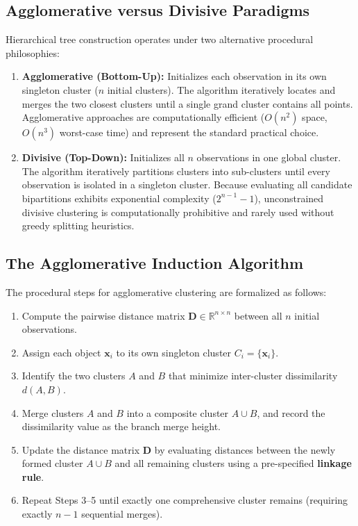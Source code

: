 \subsection{Agglomerative versus Divisive Paradigms}
Hierarchical tree construction operates under two alternative procedural philosophies:
\begin{enumerate}
    \item \textbf{Agglomerative (Bottom-Up):} Initializes each observation in its own singleton cluster ($n$ initial clusters). The algorithm iteratively locates and merges the two closest clusters until a single grand cluster contains all points. Agglomerative approaches are computationally efficient ($O(n^2)$ space, $O(n^3)$ worst-case time) and represent the standard practical choice.
    \item \textbf{Divisive (Top-Down):} Initializes all $n$ observations in one global cluster. The algorithm iteratively partitions clusters into sub-clusters until every observation is isolated in a singleton cluster. Because evaluating all candidate bipartitions exhibits exponential complexity ($2^{n-1} - 1$), unconstrained divisive clustering is computationally prohibitive and rarely used without greedy splitting heuristics.
\end{enumerate}

\subsection{The Agglomerative Induction Algorithm}
The procedural steps for agglomerative clustering are formalized as follows:
\begin{enumerate}
    \item Compute the pairwise distance matrix $\mathbf{D} \in \mathbb{R}^{n \times n}$ between all $n$ initial observations.
    \item Assign each object $\mathbf{x}_i$ to its own singleton cluster $C_i = \{\mathbf{x}_i\}$.
    \item Identify the two clusters $A$ and $B$ that minimize inter-cluster dissimilarity $d(A, B)$.
    \item Merge clusters $A$ and $B$ into a composite cluster $A \cup B$, and record the dissimilarity value as the branch merge height.
    \item Update the distance matrix $\mathbf{D}$ by evaluating distances between the newly formed cluster $A \cup B$ and all remaining clusters using a pre-specified \textbf{linkage rule}.
    \item Repeat Steps 3--5 until exactly one comprehensive cluster remains (requiring exactly $n - 1$ sequential merges).
\end{enumerate}

